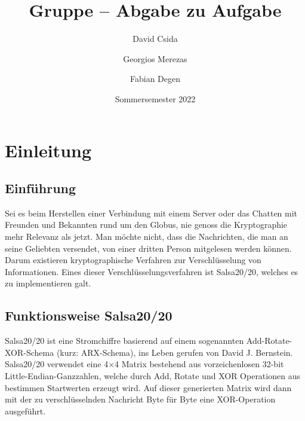 \documentclass[course=erap]{aspdoc}
\author{David Csida \and Georgios Merezas \and Fabian Degen}
\date{Sommersemester 2022} %
\title{Gruppe \theGroup{} -- Abgabe zu Aufgabe \theNumber}
\begin{document}
\maketitle

\section{Einleitung}
\subsection{Einführung}
Sei es beim Herstellen einer Verbindung mit einem Server oder das Chatten mit Freunden und Bekannten rund um
den Globus, nie genoss die Kryptographie mehr Relevanz als jetzt. Man möchte nicht, dass die Nachrichten,
die man an seine Geliebten versendet, von einer dritten Person mitgelesen werden können. Darum existieren
kryptographische Verfahren zur Verschlüsselung von Informationen. Eines dieser Verschlüsselungsverfahren ist
Salsa20/20, welches es zu implementieren galt.

\subsection{Funktionsweise Salsa20/20}
Salsa20/20 ist eine Stromchiffre basierend auf einem sogenannten Add-Rotate-XOR-Schema (kurz: ARX-Schema), ins Leben gerufen von
David J. Bernstein.
\\Salsa20/20 verwendet eine 4$\times$4 Matrix bestehend aus vorzeichenlosen 32-bit Little-Endian-Ganzzahlen,
welche durch Add, Rotate und XOR Operationen aus bestimmen Startwerten erzeugt wird.
Auf dieser generierten Matrix wird dann mit der zu verschlüsselnden Nachricht Byte für Byte eine XOR-Operation ausgeführt.
\end{document}

